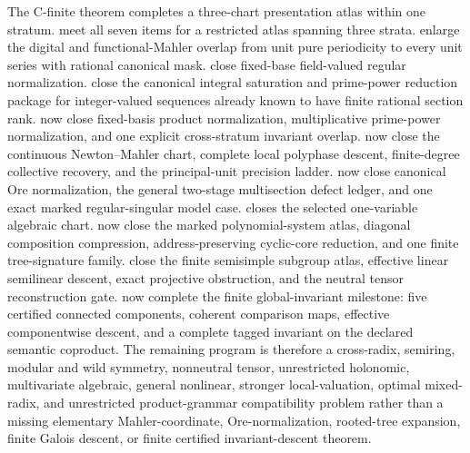 The C-finite theorem completes a three-chart presentation atlas within one stratum.   meet all seven items for a restricted atlas spanning three strata.   enlarge the digital and functional-Mahler overlap from unit pure periodicity to every unit series with rational canonical mask.   close fixed-base field-valued regular normalization.   close the canonical integral saturation and prime-power reduction package for integer-valued sequences already known to have finite rational section rank.   now close fixed-basis product normalization, multiplicative prime-power normalization, and one explicit cross-stratum invariant overlap.   now close the continuous Newton--Mahler chart, complete local polyphase descent, finite-degree collective recovery, and the principal-unit precision ladder.   now close canonical Ore normalization, the general two-stage multisection defect ledger, and one exact marked regular-singular model case.   closes the selected one-variable algebraic chart.   now close the marked polynomial-system atlas, diagonal composition compression, address-preserving cyclic-core reduction, and one finite tree-signature family.   close the finite semisimple subgroup atlas, effective linear semilinear descent, exact projective obstruction, and the neutral tensor reconstruction gate.   now complete the finite global-invariant milestone: five certified connected components, coherent comparison maps, effective componentwise descent, and a complete tagged invariant on the declared semantic coproduct.  The remaining program is therefore a cross-radix, semiring, modular and wild symmetry, nonneutral tensor, unrestricted holonomic, multivariate algebraic, general nonlinear, stronger local-valuation, optimal mixed-radix, and unrestricted product-grammar compatibility problem rather than a missing elementary Mahler-coordinate, Ore-normalization, rooted-tree expansion, finite Galois descent, or finite certified invariant-descent theorem.

